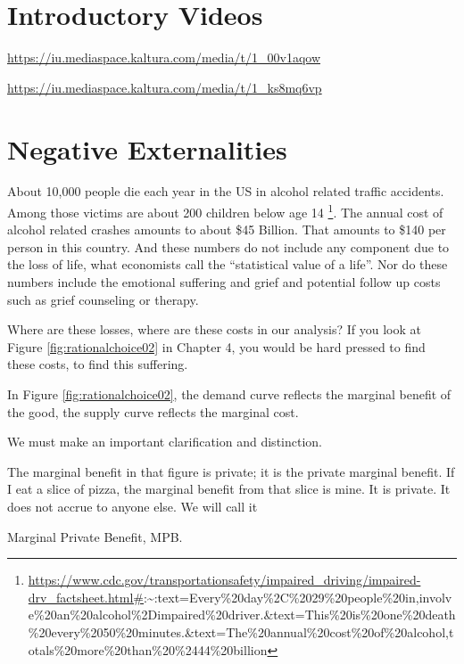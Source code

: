 \documentclass[
]{book}
\begin{document}
\hypertarget{introductory-videos}{%
\section{Introductory Videos}\label{introductory-videos}}

\url{https://iu.mediaspace.kaltura.com/media/t/1_00v1aqow}

\url{https://iu.mediaspace.kaltura.com/media/t/1_ks8mq6vp}

\hypertarget{negative-externalities}{%
\section{Negative Externalities}\label{negative-externalities}}

About 10,000 people die each year in the US in alcohol related traffic accidents. Among those victims are about 200 children below age 14 \footnote{\url{https://www.cdc.gov/transportationsafety/impaired_driving/impaired-drv_factsheet.html\#}:\textasciitilde:text=Every\%20day\%2C\%2029\%20people\%20in,involve\%20an\%20alcohol\%2Dimpaired\%20driver.\&text=This\%20is\%20one\%20death\%20every\%2050\%20minutes.\&text=The\%20annual\%20cost\%20of\%20alcohol,totals\%20more\%20than\%20\%2444\%20billion}. The annual cost of alcohol related crashes amounts to about \$45 Billion. That amounts to \$140 per person in this country. And these numbers do not include any component due to the loss of life, what economists call the ``statistical value of a life''. Nor do these numbers include the emotional suffering and grief and potential follow up costs such as grief counseling or therapy.

Where are these losses, where are these costs in our analysis? If you look at Figure \ref{fig:rationalchoice02} in Chapter 4, you would be hard pressed to find these costs, to find this suffering.

In Figure \ref{fig:rationalchoice02}, the demand curve reflects the marginal benefit of the good, the supply curve reflects the marginal cost.

We must make an important clarification and distinction.

The marginal benefit in that figure is private; it is the private marginal benefit. If I eat a slice of pizza, the marginal benefit from that slice is mine. It is private. It does not accrue to anyone else. We will call it

\begin{center}
Marginal Private Benefit, MPB.

\end{center}
\end{document}
